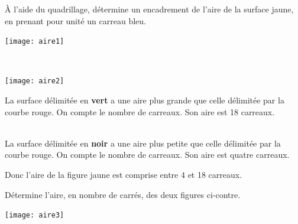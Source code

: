 \begin{methode*1}
\begin{exemple*1}
\begin{minipage}[c]{0.55\textwidth}
 À l'aide du quadrillage, détermine un encadrement de l'aire de la surface jaune, en prenant pour unité un carreau bleu.
 \end{minipage} \hfill%
 \begin{minipage}[c]{0.2\textwidth}
 \texttt{[image: aire1]}
 \end{minipage} \\
 
 \begin{minipage}[c]{0.1\textwidth}
  \texttt{[image: aire2]}
 \end{minipage} \hfill%
 \begin{minipage}[c]{0.7\textwidth}
La surface délimitée en \textbf{\textcolor{H1}{vert}} a une aire plus grande que celle délimitée par la courbe rouge. On compte le nombre de carreaux. Son aire est 18 carreaux.
 \end{minipage} \\[1em]
La surface délimitée en \textbf{noir} a une aire plus petite que celle délimitée par la courbe rouge. On compte le nombre de carreaux. Son aire est quatre carreaux.

Donc l'aire de la figure jaune est comprise entre 4 et 18 carreaux.

\end{exemple*1}

\exercice 
\begin{minipage}[c]{0.50\textwidth}
 Détermine l'aire, en nombre de carrés, des deux figures ci-contre.
 \end{minipage} \hfill%
 \begin{minipage}[c]{0.16\textwidth}
 \texttt{[image: aire3]}
 \end{minipage} \\
 
\end{methode*1}


